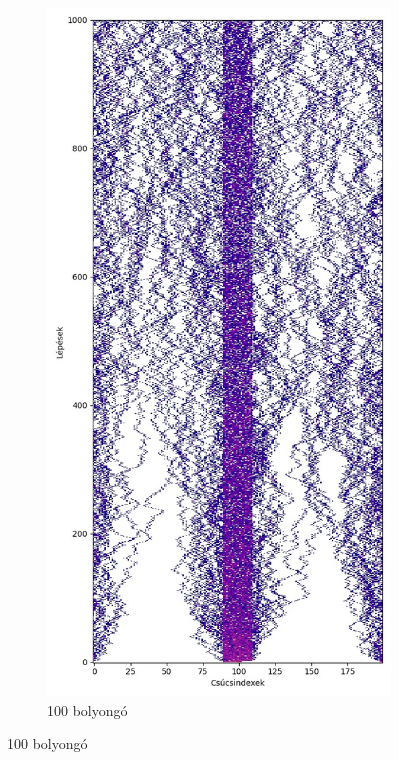 \begin{figure}[H]
  \centering
  \begin{subfigure}{.45\linewidth}
    \centering
    \includegraphics[width=\linewidth]{./figures/sulyzo/sim02.jpg}
    \caption{100 bolyongó}

\end{subfigure}
\end{figure}
